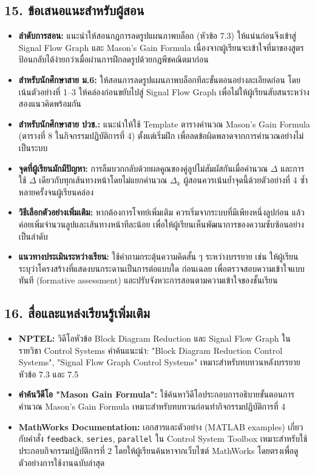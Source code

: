 \subsection{15. ข้อเสนอแนะสำหรับผู้สอน}

\begin{itemize}
    \item \textbf{ลำดับการสอน:} แนะนำให้สอนกฎการลดรูปแผนภาพบล็อก (หัวข้อ 7.3) ให้แน่นก่อนจึงเข้าสู่ Signal Flow Graph และ Mason's Gain Formula เนื่องจากผู้เรียนจะเข้าใจที่มาของสูตรป้อนกลับได้ง่ายกว่าเมื่อผ่านการฝึกลดรูปด้วยกฎพีชคณิตมาก่อน
    \item \textbf{สำหรับนักศึกษาสาย ม.6:} ให้สอนการลดรูปแผนภาพบล็อกทีละขั้นตอนอย่างละเอียดก่อน โดยเน้นตัวอย่างที่ 1–3 ให้คล่องก่อนขยับไปสู่ Signal Flow Graph เพื่อไม่ให้ผู้เรียนสับสนระหว่างสองแนวคิดพร้อมกัน
    \item \textbf{สำหรับนักศึกษาสาย ปวช.:} แนะนำให้ใช้ Template ตารางคำนวณ Mason's Gain Formula (ตารางที่ 8 ในกิจกรรมปฏิบัติการที่ 4) ตั้งแต่เริ่มฝึก เพื่อลดข้อผิดพลาดจากการคำนวณอย่างไม่เป็นระบบ
    \item \textbf{จุดที่ผู้เรียนมักมีปัญหา:} การลืมบวกกลับด้วยผลคูณของคู่ลูปไม่สัมผัสกันเมื่อคำนวณ $\Delta$ และการใช้ $\Delta$ เดียวกับทุกเส้นทางหน้าโดยไม่แยกคำนวณ $\Delta_k$ ผู้สอนควรเน้นย้ำจุดนี้ด้วยตัวอย่างที่ 4 ซ้ำหลายครั้งจนผู้เรียนคล่อง
    \item \textbf{วิธีเลือกตัวอย่างเพิ่มเติม:} หากต้องการโจทย์เพิ่มเติม ควรเริ่มจากระบบที่มีเพียงหนึ่งลูปก่อน แล้วค่อยเพิ่มจำนวนลูปและเส้นทางหน้าทีละน้อย เพื่อให้ผู้เรียนเห็นพัฒนาการของความซับซ้อนอย่างเป็นลำดับ
    \item \textbf{แนวทางประเมินระหว่างเรียน:} ใช้คำถามกระตุ้นความคิดสั้น ๆ ระหว่างบรรยาย เช่น ให้ผู้เรียนระบุว่าโครงสร้างที่แสดงบนกระดานเป็นการต่อแบบใด ก่อนเฉลย เพื่อตรวจสอบความเข้าใจแบบทันที (formative assessment) และปรับจังหวะการสอนตามความเข้าใจของชั้นเรียน
\end{itemize}


\subsection{16. สื่อและแหล่งเรียนรู้เพิ่มเติม}

\begin{itemize}
    \item \textbf{NPTEL:} วิดีโอหัวข้อ Block Diagram Reduction และ Signal Flow Graph ในรายวิชา Control Systems คำค้นแนะนำ: "Block Diagram Reduction Control Systems", "Signal Flow Graph Control Systems" เหมาะสำหรับทบทวนหลังบรรยายหัวข้อ 7.3 และ 7.5
    \item \textbf{คำค้นวิดีโอ "Mason Gain Formula":} ใช้ค้นหาวิดีโอประกอบการอธิบายขั้นตอนการคำนวณ Mason's Gain Formula เหมาะสำหรับทบทวนก่อนทำกิจกรรมปฏิบัติการที่ 4
    \item \textbf{MathWorks Documentation:} เอกสารและตัวอย่าง (MATLAB examples) เกี่ยวกับคำสั่ง \texttt{feedback}, \texttt{series}, \texttt{parallel} ใน Control System Toolbox เหมาะสำหรับใช้ประกอบกิจกรรมปฏิบัติการที่ 2 โดยให้ผู้เรียนค้นหาจากเว็บไซต์ MathWorks โดยตรงเพื่อดูตัวอย่างการใช้งานฉบับล่าสุด
\end{itemize}

